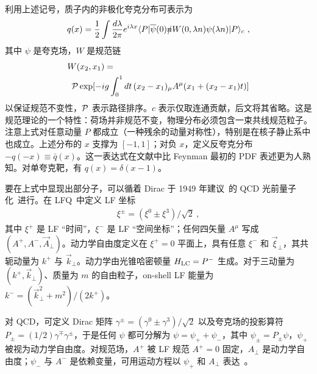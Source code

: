 利用上述记号，质子内的非极化夸克分布可表示为~\cite{Collins:2011zzd}
\begin{align}
	q(x) =\frac{1}{2} \int \frac{d\lambda}{2\pi} e^{i\lambda x}
	\langle P|\overline{\psi}(0) \slashed{n} W(0,\lambda n)\psi(\lambda n)|P\rangle_c \ ,
	\label{eq:LCqPDF}
\end{align}
其中 $\psi$ 是夸克场，$W$ 是规范链
\begin{align}
	&W(x_2, x_1)= \nonumber\\
	&\hspace{0.5em}{\cal P}\exp[-ig\int_0^1 dt\,(x_2-x_1)_\mu A^\mu(x_1+(x_2-x_1)t)]
\end{align}
以保证规范不变性，${\cal P}$ 表示路径排序。$c$ 表示仅取连通贡献，后文将其省略。这是规范理论的一个特性：荷场并非规范不变，物理分布必须包含一束共线规范粒子。注意上式对任意动量 $P$ 都成立（一种残余的动量对称性），特别是在核子静止系中也成立。上述分布的 $x$ 支撑为 $[-1,1]$；对负 $x$，定义反夸克分布 $-q(-x)\equiv \bar q(x)$。这一表达式在文献中比 Feynman 最初的 PDF 表述更为人熟知。对单夸克靶，有 $q(x)=\delta(x-1)$。

要在上式中显现出部分子，可以循着 Dirac 于 1949 年建议~\cite{Dirac:1949cp}的 QCD 光前量子化~\cite{Chang:1968bh,Kogut:1969xa,Drell:1970yt}进行。在 LFQ~\cite{Brodsky:1997de}中定义 LF 坐标
\begin{align}
	\xi^\pm = (\xi^0\pm \xi^3)/\sqrt{2} \ ,
\end{align}
其中 $\xi^+$ 是 LF ``时间''，$\xi^-$ 是 LF ``空间坐标''；任何四矢量 $A^\mu$ 写成 $(A^+,A^-,\vec{A}_\perp)$。动力学自由度定义在 $\xi^+=0$ 平面上，具有任意 $\xi^-$ 和 $\vec{\xi}_\perp$，其共轭动量为 $k^+$ 与 $\vec{k}_\perp$。动力学由光锥哈密顿量 $H_{\rm LC}=P^-$ 生成。对于三动量为 $(k^+, \vec{k}_\perp)$、质量为 $m$ 的自由粒子，{on-shell} LF 能量为 $k^-=(\vec{k}_\perp^2+m^2)/(2k^+)$。

对 QCD，可定义 Dirac 矩阵 $\gamma^\pm = (\gamma^0\pm\gamma^3)/\sqrt{2}$ 以及夸克场的投影算符 $P_\pm = (1/2)\gamma^\mp\gamma^\pm$，于是任何 $\psi$ 都可分解为 $\psi=\psi_++\psi_-$，其中 $\psi_\pm = P_\pm \psi$，$\psi_+$ 被视为动力学自由度。对规范场，$A^+$ 被 LF 规范 $A^+=0$ 固定，$A_\perp$ 是动力学自由度；$\psi_-$ 与 $A^-$ 是依赖变量，可用运动方程以 $\psi_+$ 和 $A_\perp$ 表达~\cite{Kogut:1969xa}。

